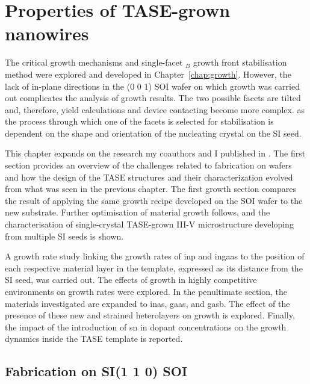 \chapter{Properties of TASE-grown nanowires}
\label{chap:properties}

The critical growth mechanisms and single-facet \(_B\) growth front stabilisation method were explored and developed in Chapter~\ref{chap:growth}. However, the lack of in-plane  directions in the \hkl(0 0 1) \acf{SOI} wafer on which growth was carried out complicates the analysis of growth results. The two possible  facets are tilted and, therefore, yield calculations and device contacting become more complex. as the process through which one of the facets is selected for stabilisation is dependent on the shape and orientation of the nucleating crystal on the \acl{SI} seed.

This chapter expands on the research my coauthors and I published in \cite{Brugnolotto2023, Brugnolotto2023_2}. The first section provides an overview of the challenges related to fabrication on  wafers and how the design of the \acf{TASE} structures and their characterization evolved from what was seen in the previous chapter. The first growth section compares the result of applying the same growth recipe developed on the  \acs{SOI} wafer to the new substrate. Further optimisation of material growth follows, and the characterisation of single-crystal \acs{TASE}-grown III-V microstructure developing from multiple \acl{SI} seeds is shown.

A growth rate study linking the growth rates of \acf{inp} and \acf{ingaas} to the position of each respective material layer in the template, expressed as its distance from the \acl{SI} seed, was carried out. The effects of growth in highly competitive environments on growth rates were explored. In the penultimate section, the materials investigated are expanded to \acf{inas}, \acf{gaas}, and \acf{gasb}. The effect of the presence of these new and strained heterolayers on growth is explored. Finally, the impact of the introduction of \acf{sn} in dopant concentrations on the growth dynamics inside the \acs{TASE} template is reported.

\section{\texorpdfstring{Fabrication on \acs{SI}\hkl(1 1 0) \acs{SOI}}{Fabrication on Si(110) SOI}}

